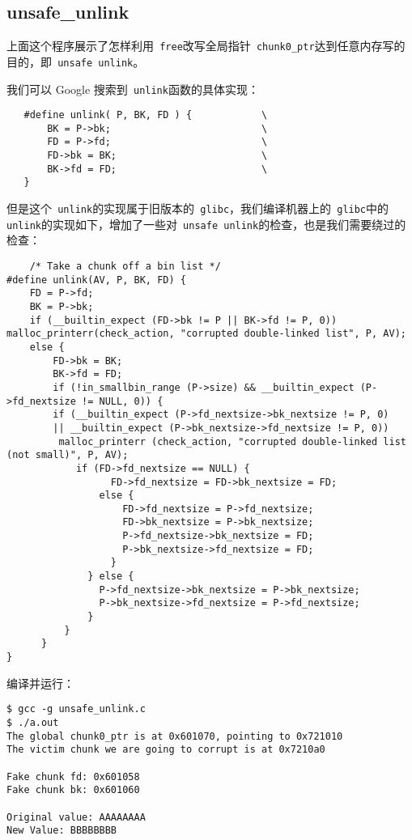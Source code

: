 \subsection{unsafe\_unlink}

上面这个程序展示了怎样利用\verb+ free+改写全局指针\verb+ chunk0_ptr+达到任意内存写的目的，即\verb+ unsafe unlink+。

我们可以 Google 搜索到\verb+ unlink+函数的具体实现：
\begin{verbatim}
   #define unlink( P, BK, FD ) {            \
       BK = P->bk;                          \
       FD = P->fd;                          \
       FD->bk = BK;                         \
       BK->fd = FD;                         \
   }
\end{verbatim}

但是这个\verb+ unlink+的实现属于旧版本的\verb+ glibc+，我们编译机器上的\verb+ glibc+中的\verb+ unlink+的实现如下，增加了一些对\verb+ unsafe unlink+的检查，也是我们需要绕过的检查：
\begin{verbatim}
    /* Take a chunk off a bin list */
#define unlink(AV, P, BK, FD) {
    FD = P->fd;
    BK = P->bk;
    if (__builtin_expect (FD->bk != P || BK->fd != P, 0)) malloc_printerr(check_action, "corrupted double-linked list", P, AV);
    else {
        FD->bk = BK;
        BK->fd = FD;
        if (!in_smallbin_range (P->size) && __builtin_expect (P->fd_nextsize != NULL, 0)) {
        if (__builtin_expect (P->fd_nextsize->bk_nextsize != P, 0)
        || __builtin_expect (P->bk_nextsize->fd_nextsize != P, 0))
         malloc_printerr (check_action, "corrupted double-linked list (not small)", P, AV);
            if (FD->fd_nextsize == NULL) {
                  FD->fd_nextsize = FD->bk_nextsize = FD;
                else {
                    FD->fd_nextsize = P->fd_nextsize;
                    FD->bk_nextsize = P->bk_nextsize;
                    P->fd_nextsize->bk_nextsize = FD;
                    P->bk_nextsize->fd_nextsize = FD;
                  }
              } else {
                P->fd_nextsize->bk_nextsize = P->bk_nextsize;
                P->bk_nextsize->fd_nextsize = P->fd_nextsize;
              }
          }
      }
}
\end{verbatim}

编译并运行：
\begin{verbatim}
$ gcc -g unsafe_unlink.c 
$ ./a.out 
The global chunk0_ptr is at 0x601070, pointing to 0x721010
The victim chunk we are going to corrupt is at 0x7210a0

Fake chunk fd: 0x601058
Fake chunk bk: 0x601060

Original value: AAAAAAAA
New Value: BBBBBBBB
\end{verbatim}

